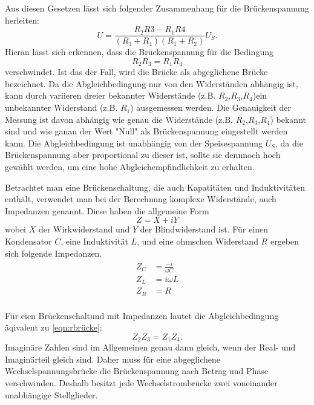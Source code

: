 Aus diesen Gesetzen lässt sich folgender Zusammenhang für die Brückenspannung
herleiten:
\begin{equation}
  U=\frac{R_{2}R{3}-R_{1}R{4}}{(R_{3}+R_{4})(R_{1}+R_{2})}U_{S}.
  \label{eqn:ubrücke}
\end{equation}
Hieran lässt sich erkennen, dass die Brückenspannung für die Bedingung
\begin{equation}
  R_{2}R_{3}=R_{1}R_{4}
  \label{eqn:rbrücke}
\end{equation}
verschwindet. Ist das der Fall, wird die Brücke als abgeglichene Brücke bezeichnet.
Da die Abgleichbedingung nur von den Widerständen abhängig ist, kann durch
variieren dreier bekannter Widerstände (z.B. $R_{2}$,$R_{3}$,$R_{4}$)ein unbekannter
Widerstand (z.B. $R_{1}$) ausgemessen werden. Die Genauigkeit der Messung ist davon
abhängig wie genau die Widerstände (z.B. $R_{2}$,$R_{3}$,$R_{4}$) bekannt sind und wie
ganau der Wert "Null" als Brückenspannung eingestellt werden kann.
Die Abgleichbedingung ist unabhängig von der Speisespannung $U_{S}$, da
die Brückenspannung aber proportional zu dieser ist, sollte sie
dennnoch hoch gewählt werden, um eine hohe Abgleichempfindlichkeit zu erhalten.

\noindent Betrachtet man eine Brückenschaltung, die auch Kapatitäten und
Induktivitäten enthält, verwendet man bei der Berechnung komplexe
Widerstände, auch Impedanzen genannt. Diese haben die allgemeine Form
\begin{equation}
  Z = X + iY
\end{equation}
wobei $X$ der Wirkwiderstand und $Y$ der Blindwiderstand ist. Für einen
Kondensator $C$, eine Induktivität $L$, und eine ohmschen Widerstand $R$
ergeben sich folgende Impedanzen.
\begin{align*}
  Z_{C} &= \frac{-i}{\omega C} \\
  Z_{L} &= i \omega L\\
  Z_{R} &= R\\
\end{align*}

\noindent Für eien Brückenschaltund mit Impedanzen lautet die Abgleichbedingung äqivalent zu
\ref{eqn:rbrücke}:
\begin{equation}
  Z_{2}Z_{3}=Z_{1}Z_{4}.
  \label{eqn:zbrücke}
\end{equation}
Imaginäre Zahlen sind im Allgemeinen genau dann gleich, wenn der Real- und
Imaginärteil gleich sind. Daher muss für eine abgeglichene Wechselspannungsbrücke
die Brückenspannung nach Betrag und Phase verschwinden.
Deshalb besitzt jede Wechselstrombrücke zwei voneinander unabhängige Stellglieder.

